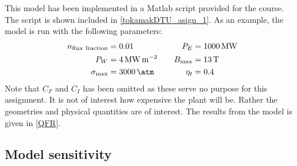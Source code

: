 This model has been implemented in a Matlab script provided for the course. The script is shown included in \cref{tokamakDTU_asign_1}.
As an example, the model is run with the following parameters:
\begin{alignat}{3}
	n_\mathrm{flux \ fraction} & = 0.01                                 & \quad P_E      & = \SI{1000}{\mega\watt} \nonumber       \\
	P_W                        & = \SI{4}{\mega\watt\per\meter\squared} & \quad B_{\max} & = \SI{13}{\tesla}    \label{Inputparam} \\
	\sigma_{\max}              & = \SI{3000}{\atm}                      & \quad \eta_t   & = 0.4 \nonumber
\end{alignat}
Note that \(C_F\) and \(C_I\) has been omitted as these serve no purpose for this assignment. It is not of interest how expensive the plant will be. Rather the geometries and physical quantities are of interest.
The results from the model is given in \cref{QFR}.


\subsection{Model sensitivity}


